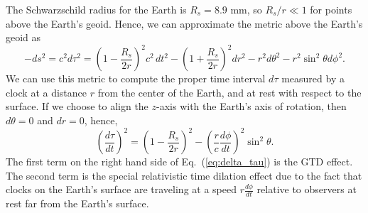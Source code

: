 \documentclass[prb,preprint]{revtex4-1}
\begin{document}
The Schwarzschild radius for the Earth is $R_s = 8.9$ mm, so $R_s/r \ll 1$ for points above the Earth's geoid. Hence, we can approximate the metric above the Earth's geoid as
\begin{equation}
\label{eq:weak}
-ds^2 = c^2 d\tau ^2 = \left(1-\frac{R_s}{2r}\right)^2 c^2\, dt^2 - \left(1+\frac{R_s}{2r}\right)^2 dr^2 - r^2 d\theta^2 - r^2 \sin^2\theta d\phi^2.
\end{equation}
We can use this metric to compute the proper time interval $d\tau$ measured by a clock at a distance $r$ from the center of the Earth, and at rest with respect to the surface. If we choose to align the $z$-axis with the Earth's axis of rotation, then $d\theta = 0$ and $dr = 0$, hence, 
\begin{equation}
\label{eq:delta_tau}
\left(\frac{d\tau}{dt}\right)^2 = \left(1-\frac{R_s}{2r}\right)^2 - \left(\frac{r}{c} \frac{d\phi}{dt}\right)^2 \sin^2\theta.
\end{equation}
The first term on the right hand side of Eq.~(\ref{eq:delta_tau}) is the GTD effect. The second term is the special relativistic time dilation effect due to the fact that clocks on the Earth's surface are traveling at a speed $r\frac{d\phi}{dt}$ relative to observers at rest far from the Earth's surface.
\end{document}
